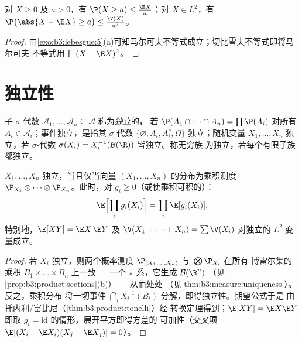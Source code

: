 \begin{proposition}[马尔可夫与切比雪夫]
\label{prop:b3:probability:markov}
对 $X \geq 0$ 及 $a > 0$，有 $\P(X \geq a) \leq \frac{\E
X}{a}$；对 $X \in L^2$，有 $\P\bigl(\abs{X - \E X} \geq
a\bigr) \leq \frac{\V(X)}{a^2}$。
\end{proposition}

\begin{proof}
由\cref{exo:b3:lebesgue:5}(a)可知马尔可夫不等式成立；切比雪夫不等式即将马尔可夫
不等式用于 $(X - \E X)^2$。
\end{proof}

\section{独立性}

\begin{definition}\label{def:b3:probability:independence}
子 $\sigma$-代数 $\mathcal A_1, \dots, \mathcal A_n
\subseteq \mathcal A$ 称为\emph{独立}的，
若 $\P(A_1\cap\dots\cap A_n) = \prod\P(A_i)$ 对所有 $A_i \in
\mathcal A_i$；事件独立，是指其 $\sigma$-代数
$\{\varnothing, A_i, A_i^c, \Omega\}$ 独立；随机变量
$X_1, \dots, X_n$ 独立，若 $\sigma$-代数 $\sigma(X_i) =
X_i^{-1}(\mathcal B(\R))$ 皆独立。称无穷族
为独立，若每个有限子族都独立。
\end{definition}

\begin{theorem}\label{thm:b3:probability:independence}
$X_1, \dots, X_n$ 独立，当且仅当向量
$(X_1, \dots, X_n)$ 的分布为乘积测度
$\P_{X_1}\otimes\cdots\otimes\P_{X_n}$。此时，对
$g_i \geq 0$（或使乘积可积的）：
\[
\E\Bigl[\prod_ig_i(X_i)\Bigr] = \prod_i\E[g_i(X_i)],
\]
特别地，$\E[XY] = \E X\,\E Y$ 及 $\V(X_1 + \dots +
X_n) = \sum\V(X_i)$ 对独立的 $L^2$ 变量成立。
\end{theorem}

\begin{proof}
若 $X_i$ 独立，则两个概率测度
$\P_{(X_1,\dots,X_n)}$ 与 $\bigotimes\P_{X_i}$ 在所有
博雷尔集的乘积 $B_1\times\dots\times B_n$ 上一致 --- 一个
$\pi$-系，它生成 $\mathcal B(\R^n)$
（见\cref{prop:b3:product:sections}(b)） --- 从而处处
（见\cref{thm:b3:measure:uniqueness}）。反之，乘积分布
将一切事件 $\bigcap_iX_i^{-1}(B_i)$ 分解，即得独立性。期望公式于是
由托内利/富比尼（\cref{thm:b3:product:tonelli}）经
转换定理得到；$\E[XY] = \E X\E Y$ 即取 $g_i =
\mathrm{id}$ 的情形，展开平方即得方差的
可加性（交叉项 $\E[(X_i - \E X_i)(X_j - \E X_j)]
= 0$）。
\end{proof}

